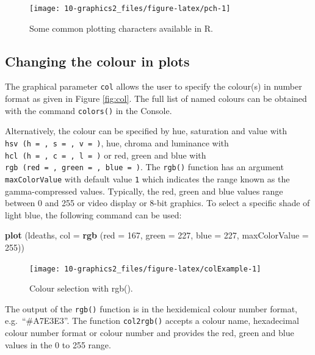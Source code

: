 \documentclass[
]{book}
\newenvironment{Shaded}{\begin{snugshade}}{\end{snugshade}}
\newcommand{\AttributeTok}[1]{\textcolor[rgb]{0.13,0.29,0.53}{#1}}
\newcommand{\DecValTok}[1]{\textcolor[rgb]{0.00,0.00,0.81}{#1}}
\newcommand{\FunctionTok}[1]{\textcolor[rgb]{0.13,0.29,0.53}{\textbf{#1}}}
\newcommand{\NormalTok}[1]{#1}
\begin{document}
\begin{figure}
\texttt{[image: 10-graphics2\_files/figure-latex/pch-1]} \caption{Some common plotting characters available in R.}\label{fig:pch}
\end{figure}

\subsection{Changing the colour in plots}\label{changing-the-colour-in-plots}

The graphical parameter \texttt{col} allows the user to specify the colour(s) in number format as given in Figure \ref{fig:col}. The full list of named colours can be obtained with the command \texttt{colors()} in the Console.

Alternatively, the colour can be specified by hue, saturation and value with \texttt{hsv\ (h\ =\ ,\ s\ =\ ,\ v\ =\ )}, hue, chroma and luminance with \texttt{hcl\ (h\ =\ ,\ c\ =\ ,\ l\ =\ )} or red, green and blue with \texttt{rgb\ (red\ =\ ,\ green\ =\ ,\ blue\ =\ )}. The \texttt{rgb()} function has an argument \texttt{maxColorValue} with default value \texttt{1} which indicates the range known as the gamma-compressed values. Typically, the red, green and blue values range between 0 and 255 or video display or 8-bit graphics. To select a specific shade of light blue, the following command can be used:

\begin{Shaded}
\begin{Highlighting}[]
\FunctionTok{plot}\NormalTok{ (ldeaths, }\AttributeTok{col =} \FunctionTok{rgb}\NormalTok{ (}\AttributeTok{red =} \DecValTok{167}\NormalTok{, }\AttributeTok{green =} \DecValTok{227}\NormalTok{, }\AttributeTok{blue =} \DecValTok{227}\NormalTok{, }
                          \AttributeTok{maxColorValue =} \DecValTok{255}\NormalTok{))}
\end{Highlighting}
\end{Shaded}

\begin{figure}
\texttt{[image: 10-graphics2\_files/figure-latex/colExample-1]} \caption{Colour selection with rgb().}\label{fig:colExample}
\end{figure}

The output of the \texttt{rgb()} function is in the hexidemical colour number format, e.g.~``\#A7E3E3''. The function \texttt{col2rgb()} accepts a colour name, hexadecimal colour number format or colour number and provides the red, green and blue values in the 0 to 255 range.
\end{document}
